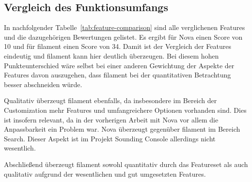 \subsection{Vergleich des Funktionsumfangs}
In nachfolgender Tabelle~\ref{tab:feature-comparison} sind alle verglichenen Features und die dazugehörigen Bewertungen gelistet.
Es ergibt für Nova einen Score von 10 und für filament einen Score von 34.
Damit ist der Vergleich der Features eindeutig und filament kann hier deutlich überzeugen.
Bei diesem hohen Punkteunterschied wäre selbst bei einer anderen Gewichtung der Aspekte der Features davon auszugehen, dass filament bei der quantitativen Betrachtung besser abschneiden würde.

Qualitativ überzeugt filament ebenfalls, da insbesondere im Bereich der Customization mehr Features und umfangreichere Optionen vorhanden sind.
Dies ist insofern relevant, da in der vorherigen Arbeit mit Nova vor allem die Anpassbarkeit ein Problem war.
Nova überzeugt gegenüber filament im Bereich Search.
Dieser Aspekt ist im Projekt Sounding Console allerdings nicht wesentlich.

Abschließend überzeugt filament sowohl quantitativ durch das Featureset als auch qualitativ aufgrund der wesentlichen und gut umgesetzten Features.


